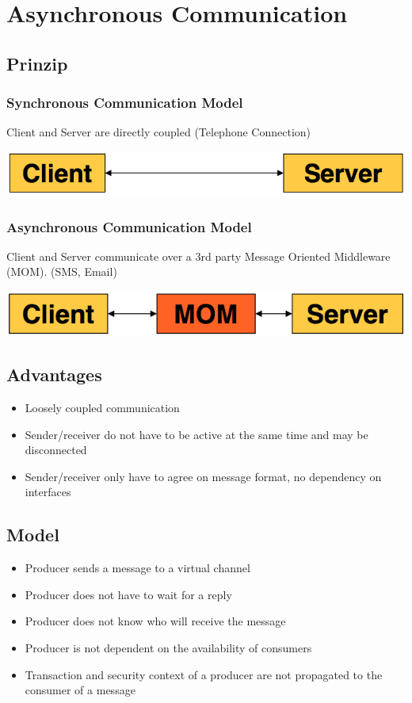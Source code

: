 \documentclass[10pt]{article}
\begin{document}
\newpage
\section{Asynchronous Communication}
\subsection{Prinzip}
\subsubsection{Synchronous Communication Model}
Client and Server are directly coupled (Telephone Connection)
\begin{center}
	\includegraphics[scale=0.25]{images/communication-synchron.png}
\end{center}
\subsubsection{Asynchronous Communication Model}
 Client and Server communicate over a 3rd party Message Oriented Middleware (MOM). (SMS, Email)
 \begin{center}
	\includegraphics[scale=0.25]{images/communication-asynchron.png}
\end{center}
\subsection{Advantages}
\begin{itemize}
	\item Loosely coupled communication
	\item Sender/receiver do not have to be active at the same time and may be disconnected
	\item Sender/receiver only have to agree on message format, no dependency on interfaces
\end{itemize}
\subsection{Model}
\begin{itemize}
	\item Producer sends a message to a virtual channel
	\item Producer does not have to wait for a reply
	\item Producer does not know who will receive the message
	\item Producer is not dependent on the availability of consumers
	\item Transaction and security context of a producer are not propagated to the consumer of a message
\end{itemize}
\end{document}
